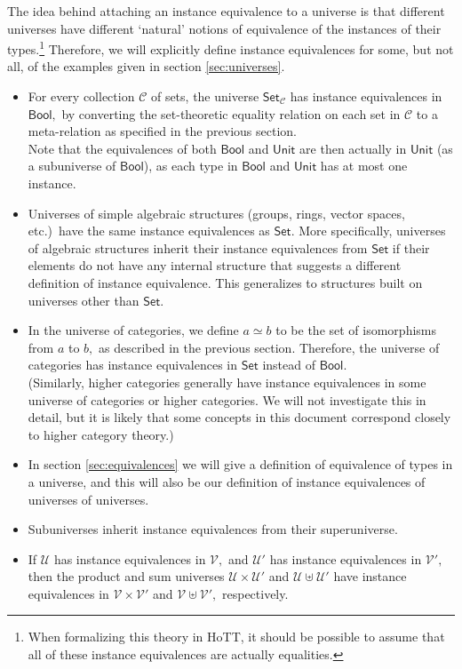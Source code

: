 \documentclass[a4paper]{article}
\theoremstyle{definition}
\theoremstyle{remark}
\renewcommand{\equiv}{\simeq}
\newcommand{\C}{\mathcal{C}}
\newcommand{\U}{\mathcal{U}}
\newcommand{\V}{\mathcal{V}}
\newcommand{\nm}{\mathsf}
\newcommand{\universe}{\nm}
\newcommand{\Unit}{\universe{Unit}}
\newcommand{\Bool}{\universe{Bool}}
\newcommand{\Set}{\universe{Set}}
\begin{document}
The idea behind attaching an instance equivalence to a universe is that different universes
have different `natural' notions of equivalence of the instances of their
types.\footnote{When formalizing this theory in HoTT, it should be possible to assume that
all of these instance equivalences are actually equalities.}
Therefore, we will explicitly define instance equivalences for some, but not all, of the
examples given in section \ref{sec:universes}.

\begin{itemize}
  \item For every collection $\C$ of sets, the universe $\Set_\C$ has instance equivalences
  in $\Bool,$ by converting the set-theoretic equality relation on each set in $\C$ to a
  meta-relation as specified in the previous section.\\
  Note that the equivalences of both $\Bool$ and $\Unit$ are then actually in $\Unit$ (as a
  subuniverse of $\Bool$), as each type in $\Bool$ and $\Unit$ has at most one instance.
  \item Universes of simple algebraic structures (groups, rings, vector spaces, etc.)\ have
  the same instance equivalences as $\Set.$ More specifically, universes of algebraic
  structures inherit their instance equivalences from $\Set$ if their elements do not have
  any internal structure that suggests a different definition of instance equivalence.
  This generalizes to structures built on universes other than $\Set.$
  \item In the universe of categories, we define $a \equiv b$ to be the set of
  isomorphisms from $a$ to $b,$ as described in the previous section. Therefore, the
  universe of categories has instance equivalences in $\Set$ instead of $\Bool.$\\
  (Similarly, higher categories generally have instance equivalences in some universe of
  categories or higher categories. We will not investigate this in detail, but it is likely
  that some concepts in this document correspond closely to higher category theory.)
  \item In section \ref{sec:equivalences} we will give a definition of equivalence of types in
  a universe, and this will also be our definition of instance equivalences of universes of
  universes.
  \item Subuniverses inherit instance equivalences from their superuniverse.
  \item If $\U$ has instance equivalences in $\V,$ and $\U'$ has instance equivalences in
  $\V',$ then the product and sum universes $\U \times \U'$ and $\U \uplus \U'$ have instance
  equivalences in $\V \times \V'$ and $\V \uplus \V',$ respectively.
\end{itemize}
\end{document}
